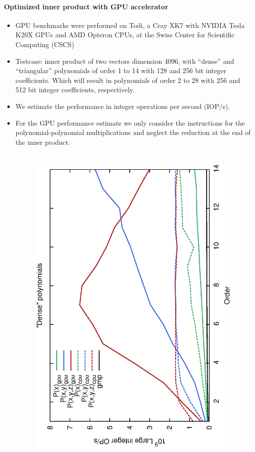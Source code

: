 \documentclass[oribibl,a4paper]{llncs2e/llncs}
\begin{document}
\paragraph{Optimized inner product with GPU accelerator}
\begin{itemize}
\item GPU benchmarks were performed on Todi, a Cray XK7 with NVIDIA Tesla K20X GPUs and AMD Opteron CPUs, at the Swiss Center for Scientific Computing (CSCS)
\item Testcase: inner product of two vectors dimension 4096, with ``dense'' and
``triangular'' polynomials of order 1 to 14 with 128 and 256 bit integer
coefficients. Which will result in polynomials of order 2 to 28 with 256 and 512 bit integer coefficients, respectively.
\item We estimate the performance in integer operations per second (IOP/s).
\item For the GPU performance estimate we only consider the instructions for the polynomial-polynomial multiplications and neglect the reduction at the end of the inner product.
\begin{figure}[t!]
    \centering
    \mbox{
        \hspace{-0.5cm}
        \includegraphics[scale=0.37, angle=-90]{ME128.eps} 
}
\end{figure}
\end{itemize}
\end{document}
